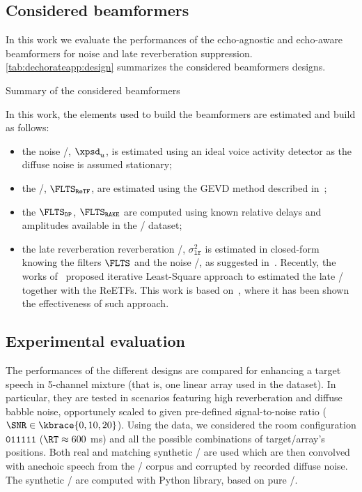 \subsection{Considered beamformers}
In this work we evaluate the performances of the echo-agnostic and echo-aware beamformers for noise and late reverberation suppression.
\cref{tab:dechorateapp:design} summarizes the considered beamformers designs.

\begin{table}[!h]
    \begin{fullwidth}

        \centering
        \small
        
        \caption{Summary of the considered beamformers}
        \label{tab:dechorateapp:design}

    \end{fullwidth}
\end{table}

\mynewline
In this work, the elements used to build the beamformers are estimated and build as follows:
\begin{itemize}
    \item the noise \xPSD/, $\xpsd_{u} $, is estimated using an ideal voice activity detector as the diffuse noise is assumed stationary;
    \item the \ReTF/, $\FLTS_{\mathtt{ReTF}}$, are estimated using the \acf{GEVD} method described in~;
    \item the $\FLTS_{\mathtt{DP}}$, $\FLTS_{\mathtt{RAKE}}$ are computed using known relative delays and amplitudes available in the \DECHORATE/ dataset;
    \item the late reverberation reverberation \xPSD/, $\sigma_{\mathtt{lr}}^2$ is estimated in closed-form knowing the filters $\FLTS$ and the noise \xPSD/, as suggested in~.
    Recently, the works of~ proposed iterative Least-Square approach to estimated the late \xPSD/ together with the \acfp{ReETF}.
    This work is based on~, where it has been shown the effectiveness of such approach.
\end{itemize}

\subsection{Experimental evaluation}
The performances of the different designs are compared for enhancing a target speech in 5-channel mixture (that is, one linear array used in the \dEchorate{} dataset).
In particular, they are tested in scenarios featuring high reverberation and diffuse babble noise, opportunely scaled to given pre-defined signal-to-noise ratio ($\SNR \in \kbrace{0, 10, 20}$).
Using the \dEchorate{} data, we considered the room configuration $\mathtt{011111}$ ($\RT \approx 600 $ ms) and all the possible combinations of target/array's positions.
Both real and matching synthetic \RIRs/ are used which are then convolved with anechoic speech from the \WSJ/ corpus and corrupted by recorded diffuse noise.
The synthetic \RIRs/ are computed with \href{https://github.com/LCAV/pyroomacoustics}{} Python library, based on pure \ISMdef/.

